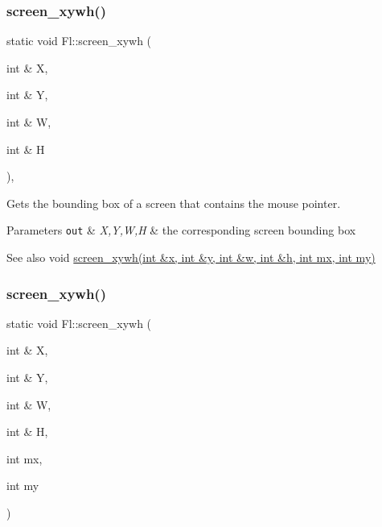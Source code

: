 \subsubsection{\texorpdfstring{screen\+\_\+xywh()}{screen\_xywh()}\hspace{0.1cm}{\footnotesize\ttfamily [1/4]}}
{\footnotesize\ttfamily static void Fl\+::screen\+\_\+xywh (\begin{DoxyParamCaption}\item[{int \&}]{X,  }\item[{int \&}]{Y,  }\item[{int \&}]{W,  }\item[{int \&}]{H }\end{DoxyParamCaption})\hspace{0.3cm}{\ttfamily [inline]}, {\ttfamily [static]}}

Gets the bounding box of a screen that contains the mouse pointer. 
\begin{DoxyParams}[1]{Parameters}
\mbox{\tt out}  & {\em X,Y,W,H} & the corresponding screen bounding box \\
\hline
\end{DoxyParams}
\begin{DoxySeeAlso}{See also}
void \hyperlink{group__fl__screen_gae6ee037d784b5b565348073526852414}{screen\+\_\+xywh(int \&x, int \&y, int \&w, int \&h, int mx, int my)} 
\end{DoxySeeAlso}
\mbox{\label{group__fl__screen_gae6ee037d784b5b565348073526852414}} 
\subsubsection{\texorpdfstring{screen\+\_\+xywh()}{screen\_xywh()}\hspace{0.1cm}{\footnotesize\ttfamily [2/4]}}
{\footnotesize\ttfamily static void Fl\+::screen\+\_\+xywh (\begin{DoxyParamCaption}\item[{int \&}]{X,  }\item[{int \&}]{Y,  }\item[{int \&}]{W,  }\item[{int \&}]{H,  }\item[{int}]{mx,  }\item[{int}]{my }\end{DoxyParamCaption})\hspace{0.3cm}{\ttfamily [static]}}

